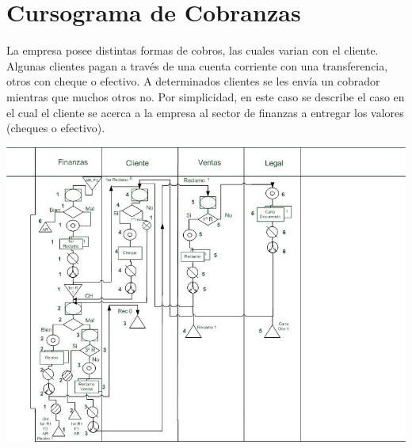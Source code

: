 \pagebreak
\section{Cursograma de Cobranzas}
La empresa posee distintas formas de cobros, las cuales varian con el cliente. Algunas clientes pagan a trav\'es de una cuenta corriente con una transferencia, otros con cheque o efectivo. A determinados clientes se les envía un cobrador mientras que muchos otros no.
Por simplicidad, en este caso se describe el caso en el cual el cliente se acerca a la empresa al sector de finanzas a entregar los valores (cheques o efectivo).
\begin{center}
  \includegraphics{Empresa/Circuitos/Cobranzas/Cursograma-para-manual-cobranzas-con-correcciones.jpg} 
\end{center}

\pagebreak
